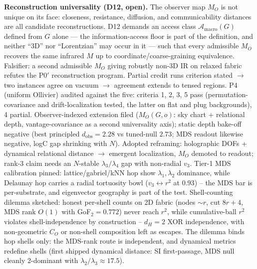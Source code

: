 \documentclass[11pt]{article}
\begin{document}
\textbf{Reconstruction universality (D12, open).} The observer map $M_O$
is not unique on its face: closeness, resistance, diffusion, and
communicability distances are all candidate reconstructions. D12 demands
an access class $\mathcal{A}_{\mathrm{macro}}(G)$ defined from $G$ alone
--- the information-access floor is part of the definition, and neither
``3D'' nor ``Lorentzian'' may occur in it --- such that every admissible
$M_O$ recovers the same infrared $M$ up to coordinate/coarse-graining
equivalence. Falsifier: a second admissible $M_O$ giving robustly non-3D
IR on relaxed fabric refutes the P0$'$ reconstruction program. Partial
credit runs criterion stated $\to$ two instances agree on vacuum $\to$
agreement extends to tensed regions. P4 (uniform Ollivier) audited
against the five: criteria 1, 2, 3, 5 pass (permutation-covariance
and drift-localization tested, the latter on flat and plug
backgrounds), 4 partial. Observer-indexed extension filed
($M_O(G,o)$: sky chart + relational depth, vantage-covariance as a
second universality axis); static depth bake-off negative (best
principled $d_{\mathrm{obs}} = 2.28$ vs tuned-null $2.73$; MDS readout
likewise negative, logC gap shrinking with $N$). Adopted reframing:
holographic DOFs + dynamical relational distance $\to$ emergent
localization, $M_O$ demoted to readout; rank-3 claim needs an
$N$-stable $\lambda_3/\lambda_4$ gap with non-radial $v_3$. Tier-1
MDS calibration pinned: lattice/gabriel/kNN hop show
$\lambda_1,\lambda_2$ dominance, while Delaunay hop carries a radial
tortuosity bowl ($v_3 \leftrightarrow r^2$ at $0.93$) -- the MDS bar
is per-substrate, and eigenvector geography is part of the test.
Shell-counting dilemma sketched: honest per-shell counts on 2D fabric
(nodes $\sim r$, cut $8r{+}4$, MDS rank $O(1)$ with GoF$_2 = 0.772$)
never reach $r^2$, while cumulative-ball $r^2$ violates
shell-independence by construction -- $d_H{=}2$ XOR independence,
with non-geometric $C_O$ or non-shell composition left as escapes.
The dilemma binds hop shells only: the MDS-rank route is independent,
and dynamical metrics redefine shells (first shipped dynamical
distance: SI first-passage, MDS null cleanly 2-dominant with
$\lambda_2/\lambda_3 \approx 17.5$).
\end{document}
